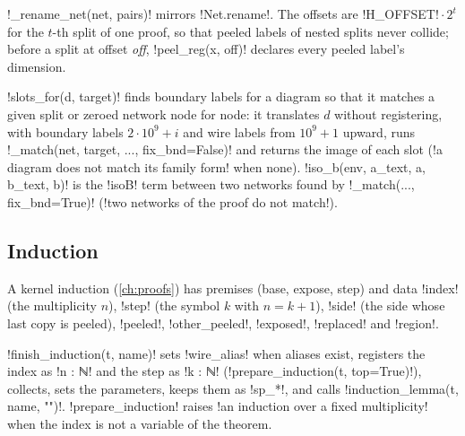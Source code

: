 {\py!_rename_net(net, pairs)! mirrors \lean!Net.rename!. The offsets are \py!H_OFFSET!${}\cdot 2^{t}$
for the $t$-th split of one proof, so that peeled labels of nested splits never collide; before
a split at offset \textit{off}, \py!peel_reg(x, off)! declares every peeled label's dimension.

\py!slots_for(d, target)! finds boundary labels for a diagram so that it matches a given split
or zeroed network node for node: it translates $d$ without registering, with boundary labels
$2\cdot10^{9}+i$ and wire labels from $10^{9}+1$ upward, runs \py!_match(net, target, ..., fix_bnd=False)!
and returns the image of each slot (\code!a diagram does not match its family form! when none).
\py!iso_b(env, a_text, a, b_text, b)! is the \lean!isoB! term between two networks found by
\py!_match(..., fix_bnd=True)! (\code!two networks of the proof do not match!).

\subsection{Induction}\label{sec:lean-export-net-induction}

A kernel induction (\cref{ch:proofs}) has premises (base, expose, step) and data \code!index!
(the multiplicity $n$), \code!step! (the symbol $k$ with $n = k+1$), \code!side! (the side whose
last copy is peeled), \code!peeled!, \code!other_peeled!, \code!exposed!, \code!replaced! and
\code!region!.

\py!finish_induction(t, name)! sets \py!wire_alias! when aliases exist, registers the index as
\code!n : ℕ! and the step as \code!k : ℕ! (\py!prepare_induction(t, top=True)!), collects,
sets the parameters, keeps them as \code!sp_*!, and calls \py!induction_lemma(t, name, "")!.
\py!prepare_induction! raises \code!an induction over a fixed multiplicity! when the index is not
a variable of the theorem.

}
